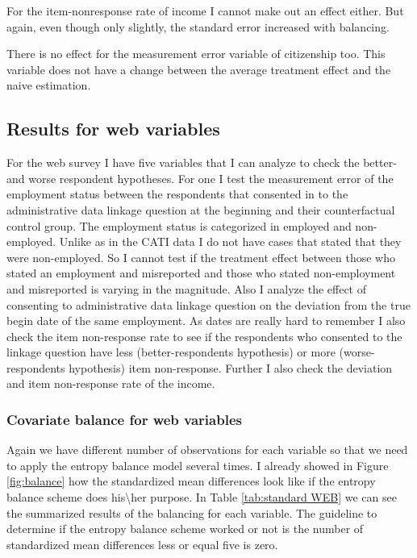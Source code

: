 For the item-nonresponse rate of income I cannot make out an effect either. But again, even though only slightly, the standard error increased with balancing.

There is no effect for the measurement error variable of citizenship too. This variable does not have a change between the average treatment effect and the naive estimation.  


\subsection{Results for web variables}

For the web survey I have five variables that I can analyze to check the better- and worse respondent hypotheses. For one I test the measurement error of the employment status between the respondents that consented in to the administrative data linkage question at the beginning and their counterfactual control group. The employment status is categorized in employed and non-employed. Unlike as in the CATI data I do not have cases that stated that they were non-employed. So I cannot test if the treatment effect between those who stated an employment and misreported and those who stated non-employment and misreported  is varying in the magnitude. Also I analyze the effect of consenting to administrative data linkage question on the deviation from the true begin date of the same employment. As dates are really hard to remember I also check the item non-response rate to see if the respondents who consented to the linkage question have less (better-respondents hypothesis) or more (worse-respondents hypothesis) item non-response. Further I also check the deviation and item non-response rate of the income. 

\subsubsection{Covariate balance for web variables}
Again we have different number of observations for each variable so that we need to apply the entropy balance model several times. I already showed in Figure \ref{fig:balance} how the standardized mean differences look like if the entropy balance scheme does his\textbackslash her purpose. In Table \ref{tab:standard WEB} we can see the summarized results of the balancing for each variable. The guideline to determine if the entropy balance scheme worked or not is the number of standardized mean differences less or equal five is zero. 



